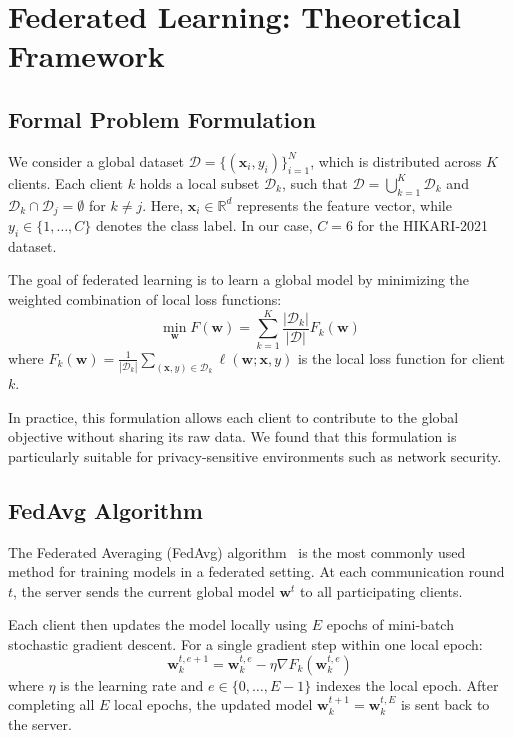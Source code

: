 \documentclass[conference]{IEEEtran}
\begin{document}
\section{Federated Learning: Theoretical Framework}
\label{sec:fl_theory}

\subsection{Formal Problem Formulation}

We consider a global dataset $\mathcal{D} = \{(\mathbf{x}_i, y_i)\}_{i=1}^{N}$, which is distributed across $K$ clients. Each client $k$ holds a local subset $\mathcal{D}_k$, such that $\mathcal{D} = \bigcup_{k=1}^{K} \mathcal{D}_k$ and $\mathcal{D}_k \cap \mathcal{D}_j = \emptyset$ for $k \neq j$. Here, $\mathbf{x}_i \in \mathbb{R}^d$ represents the feature vector, while $y_i \in \{1, \ldots, C\}$ denotes the class label. In our case, $C = 6$ for the HIKARI-2021 dataset.

The goal of federated learning is to learn a global model by minimizing the weighted combination of local loss functions:
\begin{equation}
    \min_{\mathbf{w}} F(\mathbf{w}) = \sum_{k=1}^{K} \frac{|\mathcal{D}_k|}{|\mathcal{D}|} F_k(\mathbf{w})
    \label{eq:global_obj}
\end{equation}
where $F_k(\mathbf{w}) = \frac{1}{|\mathcal{D}_k|} \sum_{(\mathbf{x},y) \in \mathcal{D}_k} \ell(\mathbf{w}; \mathbf{x}, y)$ is the local loss function for client $k$.

In practice, this formulation allows each client to contribute to the global objective without sharing its raw data. We found that this formulation is particularly suitable for privacy-sensitive environments such as network security.

\subsection{FedAvg Algorithm}

The Federated Averaging (FedAvg) algorithm~\cite{mcmahan2017} is the most commonly used method for training models in a federated setting. At each communication round $t$, the server sends the current global model $\mathbf{w}^t$ to all participating clients.

Each client then updates the model locally using $E$ epochs of mini-batch stochastic gradient descent. For a single gradient step within one local epoch:
\begin{equation}
    \mathbf{w}_k^{t,e+1} = \mathbf{w}_k^{t,e} - \eta \nabla F_k(\mathbf{w}_k^{t,e})
    \label{eq:local_update}
\end{equation}
where $\eta$ is the learning rate and $e \in \{0, \ldots, E-1\}$ indexes the local epoch. After completing all $E$ local epochs, the updated model $\mathbf{w}_k^{t+1} = \mathbf{w}_k^{t,E}$ is sent back to the server.
\end{document}
